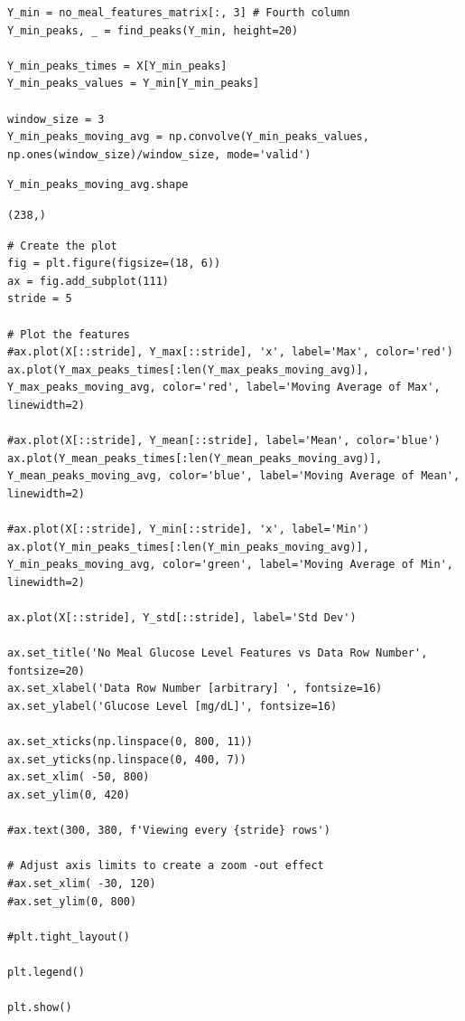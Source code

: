 \begin{verbatim}
Y_min = no_meal_features_matrix[:, 3] # Fourth column
Y_min_peaks, _ = find_peaks(Y_min, height=20)

Y_min_peaks_times = X[Y_min_peaks]
Y_min_peaks_values = Y_min[Y_min_peaks]

window_size = 3
Y_min_peaks_moving_avg = np.convolve(Y_min_peaks_values, np.ones(window_size)/window_size, mode='valid')
\end{verbatim}

\begin{verbatim}
Y_min_peaks_moving_avg.shape
\end{verbatim}

\begin{verbatim}
(238,)
\end{verbatim}

\begin{verbatim}
# Create the plot
fig = plt.figure(figsize=(18, 6))
ax = fig.add_subplot(111)
stride = 5

# Plot the features
#ax.plot(X[::stride], Y_max[::stride], 'x', label='Max', color='red')
ax.plot(Y_max_peaks_times[:len(Y_max_peaks_moving_avg)], Y_max_peaks_moving_avg, color='red', label='Moving Average of Max', linewidth=2)

#ax.plot(X[::stride], Y_mean[::stride], label='Mean', color='blue')
ax.plot(Y_mean_peaks_times[:len(Y_mean_peaks_moving_avg)], Y_mean_peaks_moving_avg, color='blue', label='Moving Average of Mean', linewidth=2)

#ax.plot(X[::stride], Y_min[::stride], 'x', label='Min')
ax.plot(Y_min_peaks_times[:len(Y_min_peaks_moving_avg)], Y_min_peaks_moving_avg, color='green', label='Moving Average of Min', linewidth=2)

ax.plot(X[::stride], Y_std[::stride], label='Std Dev')

ax.set_title('No Meal Glucose Level Features vs Data Row Number', fontsize=20)
ax.set_xlabel('Data Row Number [arbitrary] ', fontsize=16)
ax.set_ylabel('Glucose Level [mg/dL]', fontsize=16)

ax.set_xticks(np.linspace(0, 800, 11))
ax.set_yticks(np.linspace(0, 400, 7))
ax.set_xlim( -50, 800)
ax.set_ylim(0, 420)

#ax.text(300, 380, f'Viewing every {stride} rows')

# Adjust axis limits to create a zoom -out effect
#ax.set_xlim( -30, 120)
#ax.set_ylim(0, 800)

#plt.tight_layout()

plt.legend()

plt.show()
\end{verbatim}

